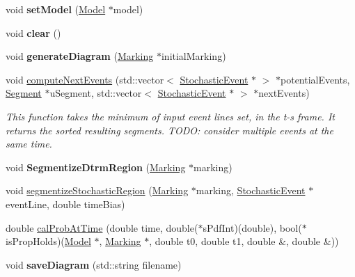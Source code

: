 \begin{DoxyCompactItemize}
\item 
\hypertarget{classTimedDiagram_adf699c8fddf11d5357faf2ef29bddd7c}{void {\bfseries set\-Model} (\hyperlink{structModel}{Model} $\ast$model)}\label{classTimedDiagram_adf699c8fddf11d5357faf2ef29bddd7c}

\item 
\hypertarget{classTimedDiagram_a7055f706b0c2444185e8d5d878626523}{void {\bfseries clear} ()}\label{classTimedDiagram_a7055f706b0c2444185e8d5d878626523}

\item 
\hypertarget{classTimedDiagram_a55bc9188cb14b08bc95dde3778579f90}{void {\bfseries generate\-Diagram} (\hyperlink{structMarking}{Marking} $\ast$initial\-Marking)}\label{classTimedDiagram_a55bc9188cb14b08bc95dde3778579f90}

\item 
void \hyperlink{classTimedDiagram_aed76b48c2a65ee7ea16a393de058e581}{compute\-Next\-Events} (std\-::vector$<$ \hyperlink{structStochasticEvent}{Stochastic\-Event} $\ast$ $>$ $\ast$potential\-Events, \hyperlink{classSegment}{Segment} $\ast$u\-Segment, std\-::vector$<$ \hyperlink{structStochasticEvent}{Stochastic\-Event} $\ast$ $>$ $\ast$next\-Events)
\begin{DoxyCompactList}\small\item\em This function takes the minimum of input event lines set, in the t-\/s frame. It returns the sorted resulting segments. T\-O\-D\-O\-: consider multiple events at the same time. \end{DoxyCompactList}\item 
\hypertarget{classTimedDiagram_a51004d1d8a2ae7d80a089a54ecf93fec}{void {\bfseries Segmentize\-Dtrm\-Region} (\hyperlink{structMarking}{Marking} $\ast$marking)}\label{classTimedDiagram_a51004d1d8a2ae7d80a089a54ecf93fec}

\item 
void \hyperlink{classTimedDiagram_aa8d8af4ac9f2e51d12b6ae23b8c506c1}{segmentize\-Stochastic\-Region} (\hyperlink{structMarking}{Marking} $\ast$marking, \hyperlink{structStochasticEvent}{Stochastic\-Event} $\ast$event\-Line, double time\-Bias)
\item 
double \hyperlink{classTimedDiagram_a45ef38a01bcffd182224747bd2a96041}{cal\-Prob\-At\-Time} (double time, double($\ast$s\-Pdf\-Int)(double), bool($\ast$is\-Prop\-Holds)(\hyperlink{structModel}{Model} $\ast$, \hyperlink{structMarking}{Marking} $\ast$, double t0, double t1, double \&, double \&))
\item 
\hypertarget{classTimedDiagram_a070d39903157613803111d696f54a7d0}{void {\bfseries save\-Diagram} (std\-::string filename)}\label{classTimedDiagram_a070d39903157613803111d696f54a7d0}


\end{DoxyCompactItemize}
